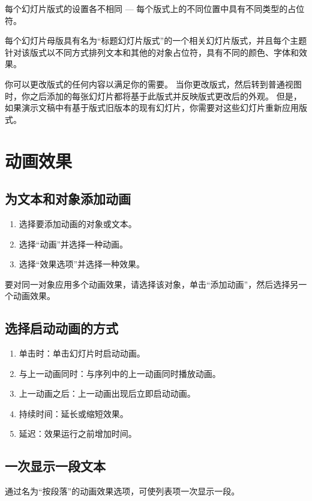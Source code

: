 每个幻灯片版式的设置各不相同 — 每个版式上的不同位置中具有不同类型的占位符。

每个幻灯片母版具有名为“标题幻灯片版式”的一个相关幻灯片版式，并且每个主题针对该版式以不同方式排列文本和其他的对象占位符，具有不同的颜色、字体和效果。

你可以更改版式的任何内容以满足你的需要。 当你更改版式，然后转到普通视图时，你之后添加的每张幻灯片都将基于此版式并反映版式更改后的外观。 但是，如果演示文稿中有基于版式旧版本的现有幻灯片，你需要对这些幻灯片重新应用版式。


\section{动画效果}

\subsection{为文本和对象添加动画}

\begin{enumerate}
    \item 选择要添加动画的对象或文本。
    \item 选择“动画”并选择一种动画。
    \item 选择“效果选项”并选择一种效果。
\end{enumerate}

要对同一对象应用多个动画效果，请选择该对象，单击“添加动画”，然后选择另一个动画效果。

\subsection{选择启动动画的方式}

\begin{enumerate}
    \item 单击时：单击幻灯片时启动动画。
    \item 与上一动画同时：与序列中的上一动画同时播放动画。
    \item 上一动画之后：上一动画出现后立即启动动画。
    \item 持续时间：延长或缩短效果。
    \item 延迟：效果运行之前增加时间。
\end{enumerate}

\subsection{一次显示一段文本}

通过名为“按段落”的动画效果选项，可使列表项一次显示一段。

